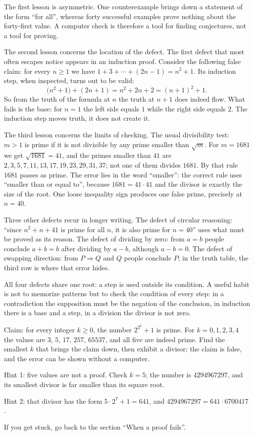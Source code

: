 The first lesson is asymmetric. One counterexample brings down a statement
of the form ``for all'', whereas forty successful examples prove nothing
about the forty-first value. A computer check is therefore a tool for finding conjectures,
not a tool for proving.

The second lesson concerns the location of the defect. The first defect that most often escapes notice appears
in an induction proof. Consider the following false claim: for every $n \geq 1$
we have $1+3+\cdots+(2n-1) = n^{2}+1$. Its induction step, when inspected, turns out to be
valid:
\[
  \bigl(n^{2}+1\bigr) + (2n+1) = n^{2} + 2n + 2 = (n+1)^{2} + 1 .
\]
So from the truth of the formula at $n$ the truth at $n+1$ does indeed flow. What fails
is the base: for $n = 1$ the left side equals $1$ while the right side equals $2$.
The induction step moves truth, it does not create it.

The third lesson concerns the limits of checking. The usual divisibility test: $m > 1$ is prime if
it is not divisible by any prime smaller than $\sqrt{m}$. For $m = 1681$ we get $\sqrt{1681} = 41$, and the primes
smaller than $41$ are $2, 3, 5, 7, 11, 13, 17, 19, 23, 29, 31, 37$; not
one of them divides $1681$. By that rule $1681$ passes as prime. The error lies
in the word ``smaller'': the correct rule uses ``smaller than or equal to'',
because $1681 = 41 \cdot 41$ and the divisor is exactly the size of the root. One loose inequality sign
produces one false prime, precisely at $n = 40$.

Three other defects recur in longer writing. The defect of circular reasoning:
``since $n^{2}+n+41$ is prime for all $n$, it is also prime for $n = 40$'' uses
what must be proved as its reason. The defect of dividing by zero: from $a = b$ people
conclude $a+b = b$ after dividing by $a-b$, although $a-b = 0$. The defect of swapping
direction: from $P \Rightarrow Q$ and $Q$ people conclude $P$; in the truth table,
the third row is where that error hides.

All four defects share one root: a step is used outside its condition.
A useful habit is not to memorize patterns but to check the condition of every step:
in a contradiction the supposition must be the negation of the conclusion, in induction there is a base and a
step, in a division the divisor is not zero.

\begin{tantangan}
Claim: for every integer $k \geq 0$, the number $2^{2^{k}}+1$ is prime. For
$k = 0,1,2,3,4$ the values are $3$, $5$, $17$, $257$, $65537$, and all five are indeed prime.
Find the smallest $k$ that brings the claim down, then exhibit a divisor; the claim is
false, and the error can be shown without a computer.

Hint 1: five values are not a proof. Check $k = 5$; the number is $4294967297$, and its smallest
divisor is far smaller than its square root.

Hint 2: that divisor has the form $5 \cdot 2^{7}+1 = 641$, and
$4294967297 = 641 \cdot 6700417$.

If you get stuck, go back to the section ``When a proof fails''.
\end{tantangan}

